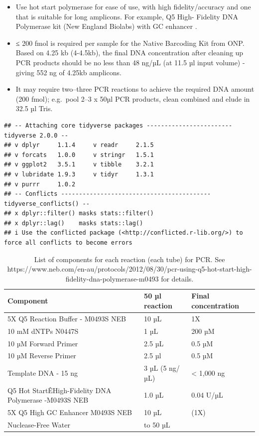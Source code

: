 \documentclass[
]{book}
\providecommand{\tightlist}{%
  \setlength{\itemsep}{0pt}\setlength{\parskip}{0pt}}
\begin{document}
\begin{itemize}
\tightlist
\item
  Use hot start polymerase for ease of use, with high fidelity/accuracy and one that is suitable for long amplicons. For example, Q5 High- Fidelity DNA Polymerase kit (New England Biolabs) with GC enhancer \citep{Martijn2019}.\\
\item
  ≤ 200 fmol is required per sample for the Native Barcoding Kit from ONP. Based on 4.25 kb (4-4.5kb), the final DNA concentration after cleaning up PCR products should be no less than 48 ng/µL (at 11.5 µl input volume) - giving 552 ng of 4.25kb amplicons.\\
\item
  It may require two--three PCR reactions to achieve the required DNA amount (200 fmol); e.g.~pool 2--3 x 50µl PCR products, clean combined and elude in 32.5 µl Tris.
\end{itemize}

\begin{verbatim}
## -- Attaching core tidyverse packages ------------------------ tidyverse 2.0.0 --
## v dplyr     1.1.4     v readr     2.1.5
## v forcats   1.0.0     v stringr   1.5.1
## v ggplot2   3.5.1     v tibble    3.2.1
## v lubridate 1.9.3     v tidyr     1.3.1
## v purrr     1.0.2     
## -- Conflicts ------------------------------------------ tidyverse_conflicts() --
## x dplyr::filter() masks stats::filter()
## x dplyr::lag()    masks stats::lag()
## i Use the conflicted package (<http://conflicted.r-lib.org/>) to force all conflicts to become errors
\end{verbatim}

\begin{table}

\caption{\label{tab:table}List of components for each reaction (each tube) for PCR. See https://www.neb.com/en-au/protocols/2012/08/30/pcr-using-q5-hot-start-high-fidelity-dna-polymerase-m0493 for details.  }
\centering
\begin{tabular}[t]{lll}
\toprule
Component & 50 µl reaction & Final concentration\\
\midrule
5X Q5 Reaction Buffer - M0493S NEB & 10 µL & 1X\\
10 mM dNTPs N0447S & 1 µL & 200 µM\\
10 µM Forward Primer & 2.5 µL & 0.5 µM\\
10 µM Reverse Primer & 2.5 µl & 0.5 µM\\
Template DNA - 15 ng & 3 µL (5 ng/µL) & < 1,000 ng\\
\addlinespace
Q5 Hot StartÊHigh-Fidelity DNA Polymerase -M0493S NEB & 1.0 µL & 0.04 U/µL\\
5X Q5 High GC Enhancer M0493S NEB & 10 µL & (1X)\\
Nuclease-Free Water & to 50 µL & \\
\bottomrule
\end{tabular}
\end{table}

  
\end{document}
